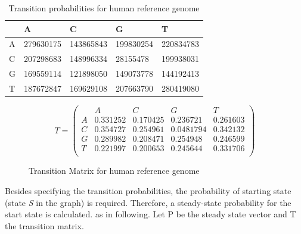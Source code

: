 \documentclass[11pt,a4paper]{report}
\begin{document}
\begin{table}[h]
  \begin{tabular}{ |  p{1cm} | p{2cm} | p{2cm} | p{2cm} | p{2cm} |}
    \hline
  	  
 	             & A   & C & G & T \\ \hline
      A  & 279630175  & 143865843 & 199830254 & 220834783 \\ \hline
 	  C	 & 207298683  & 148996334 & 28155478 & 199938031\\ \hline
 	  G	 & 169559114  & 121898050 & 149073778 & 144192413\\ \hline
 	  T  & 187672847  & 169629108  & 207663790 & 280419080\\ \hline
      
 	  
   \end{tabular}
  \caption{Transition probabilities for human reference genome}
 \label{transition-table}
\end{table}



\begin{figure}[H]
 \centering
\[
T = 
 \begin{pmatrix}
   &  A  & C & G & T  \\
 A & 0.331252 & 0.170425 & 0.236721 & 0.261603  \\
 C & 0.354727 & 0.254961 & 0.0481794 & 0.342132  \\
 G & 0.289982 & 0.208471 & 0.254948 & 0.246599  \\
 T & 0.221997 & 0.200653 & 0.245644 & 0.331706 \\
  
 \end{pmatrix}
\]
 \caption{Transition Matrix for human reference genome}
 \label{transition-matrix}
\end{figure}


Besides specifying the transition probabilities, the probability of starting 
state (state \emph{S} in the graph) is required. 
Therefore, a steady-state probability for the start state is calculated.
 as in following. 
Let P be the steady state vector and T the transition matrix.
\end{document}
